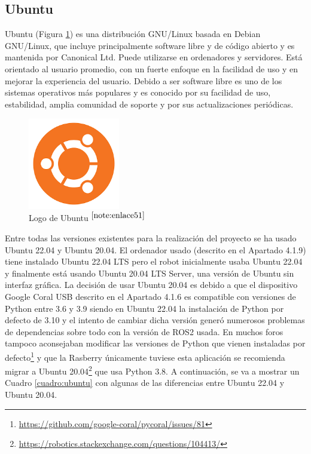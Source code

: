 \setcounter{footnote}{50} %


\subsection{Ubuntu}

Ubuntu (Figura \ref{fig:ubuntu}) es una distribución GNU/Linux basada en Debian GNU/Linux, que incluye principalmente software libre y de código abierto y es mantenida por Canonical Ltd. Puede utilizarse en ordenadores y servidores. Está orientado al usuario promedio, con un fuerte enfoque en la facilidad de uso y en mejorar la experiencia del usuario. Debido a ser software libre es uno de los sistemas operativos más populares y es conocido por su facilidad de uso, estabilidad, amplia comunidad de soporte y por sus actualizaciones periódicas.

\begin{figure} [h!]
	\begin{center}
		\includegraphics[width=4cm]{figs/ubuntu.png}
	\end{center}
	\caption{Logo de Ubuntu $^{\ref{note:enlace51}}$} 
	\label{fig:ubuntu}
\end{figure}

\setcounter{footnote}{51} %

Entre todas las versiones existentes para la realización del proyecto se ha usado Ubuntu 22.04 y Ubuntu 20.04. El ordenador usado (descrito en el Apartado 4.1.9) tiene instalado Ubuntu 22.04 \ac{LTS} pero el robot inicialmente usaba Ubuntu 22.04 y finalmente está usando Ubuntu 20.04 \acs{LTS} Server, una versión de Ubuntu sin interfaz gráfica. La decisión de usar Ubuntu 20.04 es debido a que el dispositivo Google Coral USB descrito en el Apartado 4.1.6 es compatible con versiones de Python entre 3.6 y 3.9 siendo en Ubuntu 22.04 la instalación de Python por defecto de 3.10 y el intento de cambiar dicha versión generó numerosos problemas de dependencias sobre todo con la versión de ROS2 usada. En muchos foros tampoco aconsejaban modificar las versiones de Python que vienen instaladas por defecto\footnote{\url{https://github.com/google-coral/pycoral/issues/81}} y que la Rasberry únicamente tuviese esta aplicación se recomienda migrar a Ubuntu 20.04\footnote{\url{https://robotics.stackexchange.com/questions/104413/}} que usa Python 3.8. A continuación, se va a mostrar un Cuadro \ref{cuadro:ubuntu} con algunas de las diferencias entre Ubuntu 22.04 y Ubuntu 20.04.

